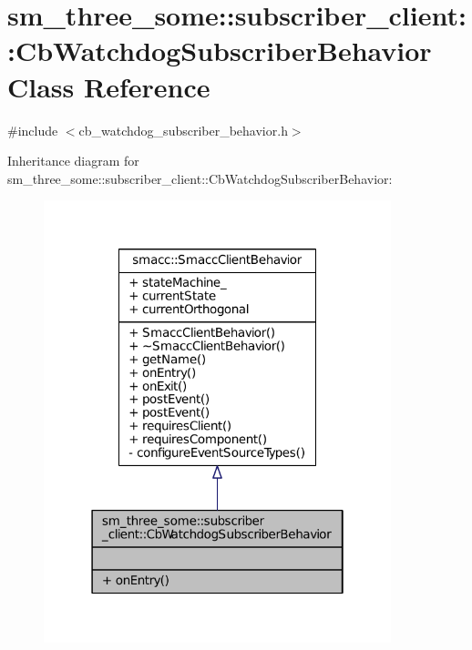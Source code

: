 \hypertarget{classsm__three__some_1_1subscriber__client_1_1CbWatchdogSubscriberBehavior}{}\section{sm\+\_\+three\+\_\+some\+:\+:subscriber\+\_\+client\+:\+:Cb\+Watchdog\+Subscriber\+Behavior Class Reference}
\label{classsm__three__some_1_1subscriber__client_1_1CbWatchdogSubscriberBehavior}


{\ttfamily \#include $<$cb\+\_\+watchdog\+\_\+subscriber\+\_\+behavior.\+h$>$}



Inheritance diagram for sm\+\_\+three\+\_\+some\+:\+:subscriber\+\_\+client\+:\+:Cb\+Watchdog\+Subscriber\+Behavior\+:
\nopagebreak
\begin{figure}[H]
\begin{center}
\leavevmode
\includegraphics[width=286pt]{classsm__three__some_1_1subscriber__client_1_1CbWatchdogSubscriberBehavior__inherit__graph}
\end{center}
\end{figure}


